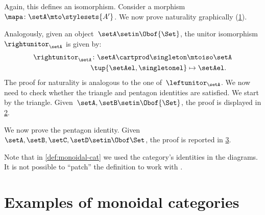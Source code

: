 \begin{example}
    Again, this defines an isomorphism.
    Consider a morphism~$\mapa\colon \setA\mto \stylesets{A'}$.
    We now prove naturality graphically (\cref{fig:monoidal_set_unit_nat}).

    \begin{figure}[h!]
        \centering
        \caption{}
        \label{fig:monoidal_set_unit_nat}
    \end{figure}

    Analogously, given an object~$\setA\setin \Obof{\Set}$, the unitor isomorphism~$\rightunitor_\setA$ is given by:
    \begin{equation}
        \label{eq:set_mon_prod_5}
        \begin{aligned}
            \rightunitor_\setA\colon \setA\cartprod \singleton & \mtoiso \setA \\
            \tup{\setAel,\singletonel}                         & \mapsto \setAel.
        \end{aligned}
    \end{equation}
    The proof for naturality is analogous to the one of~$\leftunitor_\setA$.
    We now need to check whether the triangle and pentagon identities are satisfied.
    We start by the triangle.
    Given~$\setA,\setB\setin \Obof{\Set}$, the proof is displayed in \cref{fig:set_mon_triangle}.

    \begin{figure}[h]
        \centering
        \caption{}
        \label{fig:set_mon_triangle}
    \end{figure}

    We now prove the pentagon identity.
    Given~$\setA,\setB,\setC,\setD\setin \Obof\Set$, the proof is reported in \cref{fig:set_mon_pent}.

    \begin{figure}[h]
        \centering
        \caption{}
        \label{fig:set_mon_pent}
    \end{figure}
\end{example}

\begin{remark}
    Note that in \cref{def:monoidal-cat} we used the category's identities in the diagrams.
    It is not possible to ``patch'' the definition to work with .
\end{remark}

\section{Examples of monoidal categories}

